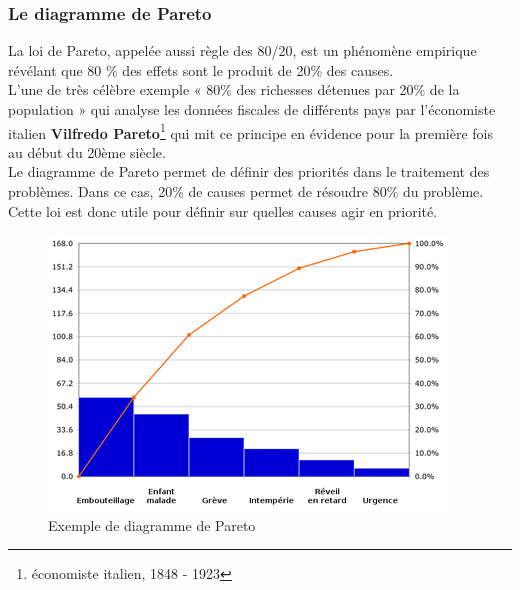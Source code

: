 \documentclass[12pt, a4paper]{thesis}
\begin{document}
\subsubsection{Le diagramme de Pareto}
La loi de Pareto, appelée aussi  règle des 80/20, est un phénomène empirique révélant que 80 \% des effets sont le produit de 20\% des causes.\\
L’une de très célèbre exemple « 80\% des richesses détenues par 20\% de la population » qui analyse les données fiscales de différents pays par l’économiste italien \textbf{Vilfredo Pareto}\footnote{économiste italien, 1848 - 1923} qui mit ce principe en évidence pour la première fois au début du 20ème siècle.\\
Le diagramme de Pareto permet de définir des priorités dans le traitement des problèmes. Dans ce cas, 20\% de causes permet de résoudre 80\% du problème. Cette loi est donc utile pour définir sur quelles causes agir en priorité.
\begin{figure}[!h]
\begin{center}
        \includegraphics[scale=0.7]{diag.png}
        \caption{Exemple de diagramme de Pareto}
\end{center}
\end{figure}
\end{document}
